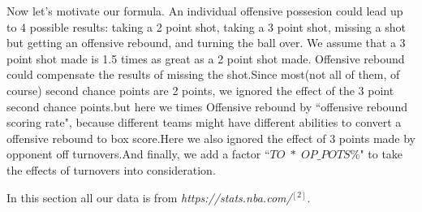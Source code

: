 \documentclass[11pt]{article}
\begin{document}
Now let's motivate our formula. An individual offensive possesion could lead up to 4 possible results: taking a 2 point shot, taking a 3 point shot, missing a shot but getting an offensive rebound, and turning the ball over. We assume that a 3 point shot made is 1.5 times as great as a 2 point shot made. Offensive rebound could compensate the results of missing the shot.Since most(not all of them, of course) second chance points are 2 points, we ignored the effect of the 3 point second chance points.but here we times Offensive rebound by ``offensive rebound scoring rate", because different teams might have different abilities to convert a offensive rebound to box score.Here we also ignored the effect of 3 points made by opponent off turnovers.And finally, we add a factor ``$TO\; * \;OP\_POTS\%$" to take the effects of turnovers into consideration.

In this section all our data is from \textit{https://stats.nba.com/}$^{[2]}$.
\end{document}
